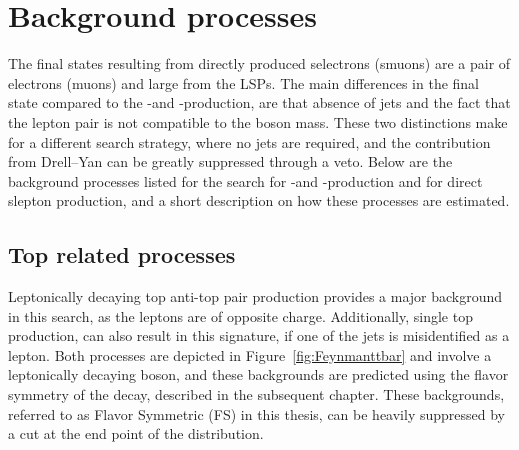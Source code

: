 \section{Background processes}
The final states resulting from directly produced selectrons (smuons) are a pair of electrons (muons) and large \ptmiss from the LSPs. 
The main differences in the final state compared to the \firstcharg-\secondchi and \firstchi-\firstchi production, are that absence of jets and the fact that the lepton pair is not compatible to the \PZ boson mass. 
These two distinctions make for a different search strategy, where no jets are required, and the contribution from Drell--Yan can be greatly suppressed through a veto. 
Below are the background processes listed for the search for \firstcharg-\secondchi and \firstchi-\firstchi production and for direct slepton production, and a short description on how these processes are estimated. 
\subsection{Top related processes}
Leptonically decaying top anti-top pair production provides a major background in this search, as the leptons are of opposite charge. 
Additionally, single top production, can also result in this signature, if one of the jets is misidentified as a lepton. 
Both processes are depicted in Figure~\ref{fig:Feynmanttbar} and involve a leptonically decaying \PW boson, and these backgrounds are predicted using the flavor symmetry of the \PW decay, described in the subsequent chapter. 
These backgrounds, referred to as Flavor Symmetric (FS) in this thesis, can be heavily suppressed by a cut at the end point of the \mttwo distribution. 

